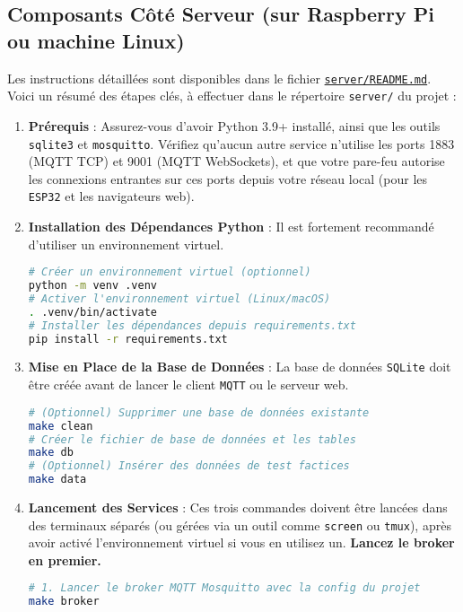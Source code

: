 \documentclass[12pt]{article}
\begin{document}
\subsection{Composants Côté Serveur (sur Raspberry Pi ou machine Linux)}

Les instructions détaillées sont disponibles dans le fichier \href{https://github.com/GreengagePlum/Project-IOT/blob/v1.0.0/server/README.md}{\texttt{server/README.md}}. Voici un résumé des étapes clés, à effectuer dans le répertoire \texttt{server/} du projet :

\begin{enumerate}
    \item \textbf{Prérequis} : Assurez-vous d'avoir Python 3.9+ installé, ainsi que les outils \texttt{sqlite3} et \texttt{mosquitto}. Vérifiez qu'aucun autre service n'utilise les ports 1883 (MQTT TCP) et 9001 (MQTT WebSockets), et que votre pare-feu autorise les connexions entrantes sur ces ports depuis votre réseau local (pour les \texttt{ESP32} et les navigateurs web).

    \item \textbf{Installation des Dépendances Python} : Il est fortement recommandé d'utiliser un environnement virtuel.
        \begin{lstlisting}[language=bash]
# Créer un environnement virtuel (optionnel)
python -m venv .venv
# Activer l'environnement virtuel (Linux/macOS)
. .venv/bin/activate
# Installer les dépendances depuis requirements.txt
pip install -r requirements.txt
        \end{lstlisting}

    \item \textbf{Mise en Place de la Base de Données} : La base de données \texttt{SQLite} doit être créée avant de lancer le client \texttt{MQTT} ou le serveur web.
        \begin{lstlisting}[language=bash]
# (Optionnel) Supprimer une base de données existante
make clean
# Créer le fichier de base de données et les tables
make db
# (Optionnel) Insérer des données de test factices
make data
        \end{lstlisting}

    \item \textbf{Lancement des Services} : Ces trois commandes doivent être lancées dans des terminaux séparés (ou gérées via un outil comme \texttt{screen} ou \texttt{tmux}), après avoir activé l'environnement virtuel si vous en utilisez un. \textbf{Lancez le broker en premier.}
        \begin{lstlisting}[language=bash]
# 1. Lancer le broker MQTT Mosquitto avec la config du projet
make broker


\end{lstlisting}
\end{enumerate}
\end{document}
